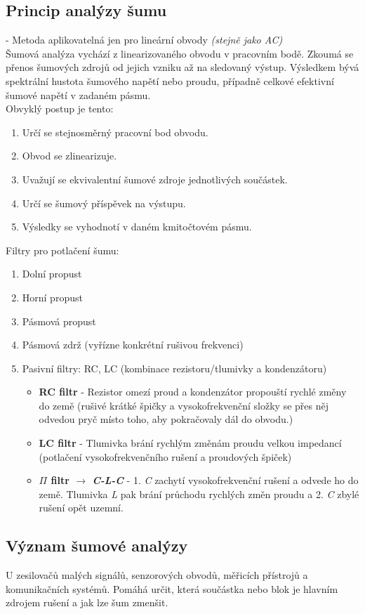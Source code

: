 \subsection{Princip analýzy šumu} 
- Metoda aplikovatelná jen pro lineární obvody \textit{(stejně jako AC)}\\
Šumová analýza vychází z linearizovaného obvodu v pracovním bodě. Zkoumá se přenos šumových zdrojů od jejich vzniku až na sledovaný výstup. Výsledkem bývá spektrální hustota šumového napětí nebo proudu, případně celkové efektivní šumové napětí v zadaném pásmu.\\
Obvyklý postup je tento:
\begin{enumerate}
	\item Určí se stejnosměrný pracovní bod obvodu.
	\item Obvod se zlinearizuje.
	\item Uvažují se ekvivalentní šumové zdroje jednotlivých součástek.
	\item Určí se šumový příspěvek na výstupu.
	\item Výsledky se vyhodnotí v daném kmitočtovém pásmu.
\end{enumerate}
Filtry pro potlačení šumu:
\begin{enumerate}
	\item Dolní propust
	\item Horní propust
	\item Pásmová propust
	\item Pásmová zdrž (vyřízne konkrétní rušivou frekvenci)
	\item Pasivní filtry: RC, LC (kombinace rezistoru/tlumivky a kondenzátoru)
	\begin{itemize}
		\item \textbf{RC filtr} - Rezistor omezí proud a kondenzátor propouští rychlé změny do země (rušivé krátké špičky a vysokofrekvenční složky se přes něj odvedou pryč místo toho, aby pokračovaly dál do obvodu.)
		\item \textbf{LC filtr} - Tlumivka brání rychlým změnám proudu velkou impedancí (potlačení vysokofrekvenčního rušení a proudových špiček)
		\item \textbf{$\Pi$ filtr $\rightarrow$ \textit{C-L-C}} - 1. \textit{C} zachytí vysokofrekvenční rušení a odvede ho do země. Tlumivka \textit{L} pak brání průchodu rychlých změn proudu a 2. \textit{C} zbylé rušení opět uzemní.
	\end{itemize}
\end{enumerate}

\subsection{Význam šumové analýzy}
U zesilovačů malých signálů, senzorových obvodů, měřicích přístrojů a komunikačních systémů. Pomáhá určit, která součástka nebo blok je hlavním zdrojem rušení a jak lze šum zmenšit.

